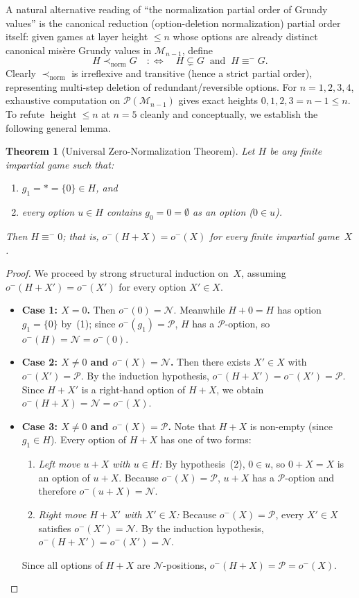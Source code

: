 \documentclass[11pt]{amsart}
\newtheorem{theorem}{Theorem}[section]
\theoremstyle{definition}
\theoremstyle{remark}
\newcommand{\Npos}{\mathcal{N}}
\newcommand{\Ppos}{\mathcal{P}}
\newcommand{\Mlayer}{\mathcal{M}}
\DeclareMathOperator{\height}{height}
\begin{document}
A natural alternative reading of ``the normalization partial order of Grundy values'' is the canonical reduction (option-deletion normalization) partial order itself: given games at layer height $\le n$ whose options are already distinct canonical mis\`ere Grundy values in $\Mlayer_{n-1}$, define
\[
  H \prec_{\mathrm{norm}} G \quad :\Longleftrightarrow \quad H \subsetneq G \;\;\text{and}\;\; H \equiv^- G.
\]
Clearly $\prec_{\mathrm{norm}}$ is irreflexive and transitive (hence a strict partial order), representing multi-step deletion of redundant/reversible options. For $n = 1, 2, 3, 4$, exhaustive computation on $\mathcal{P}(\Mlayer_{n-1})$ gives exact heights $0, 1, 2, 3 = n - 1 \le n$. To refute $\height \le n$ at $n = 5$ cleanly and conceptually, we establish the following general lemma.

\begin{theorem}[Universal Zero-Normalization Theorem]
\label{thm:zero_norm}
Let $H$ be any finite impartial game such that:
\begin{enumerate}
  \item $g_1 = * = \{0\} \in H$, and
  \item every option $u \in H$ contains $g_0 = 0 = \emptyset$ as an option ($0 \in u$).
\end{enumerate}
Then $H \equiv^- 0$; that is, $o^-(H + X) = o^-(X)$ for every finite impartial game~$X$.
\end{theorem}

\begin{proof}
We proceed by strong structural induction on~$X$, assuming $o^-(H + X') = o^-(X')$ for every option $X' \in X$.
\begin{itemize}
  \item \textbf{Case 1: $X = 0$.} Then $o^-(0) = \Npos$. Meanwhile $H + 0 = H$ has option $g_1 = \{0\}$ by~(1); since $o^-(g_1) = \Ppos$, $H$ has a $\Ppos$-option, so $o^-(H) = \Npos = o^-(0)$.
  \item \textbf{Case 2: $X \neq 0$ and $o^-(X) = \Npos$.} Then there exists $X' \in X$ with $o^-(X') = \Ppos$. By the induction hypothesis, $o^-(H + X') = o^-(X') = \Ppos$. Since $H + X'$ is a right-hand option of $H + X$, we obtain $o^-(H + X) = \Npos = o^-(X)$.
  \item \textbf{Case 3: $X \neq 0$ and $o^-(X) = \Ppos$.} Note that $H + X$ is non-empty (since $g_1 \in H$). Every option of $H + X$ has one of two forms:
  \begin{enumerate}
    \item \emph{Left move $u + X$ with $u \in H$:} By hypothesis~(2), $0 \in u$, so $0 + X = X$ is an option of $u + X$. Because $o^-(X) = \Ppos$, $u + X$ has a $\Ppos$-option and therefore $o^-(u + X) = \Npos$.
    \item \emph{Right move $H + X'$ with $X' \in X$:} Because $o^-(X) = \Ppos$, every $X' \in X$ satisfies $o^-(X') = \Npos$. By the induction hypothesis, $o^-(H + X') = o^-(X') = \Npos$.
  \end{enumerate}
  Since all options of $H + X$ are $\Npos$-positions, $o^-(H + X) = \Ppos = o^-(X)$. \qedhere
\end{itemize}
\end{proof}
\end{document}
